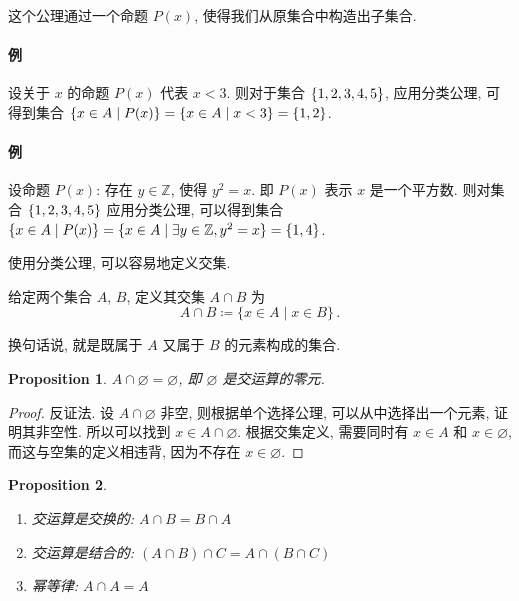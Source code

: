 \documentclass[UTF8]{ctexart}
\theoremstyle{mystyle}
\newtheorem{proposition}{Proposition}[section]
\theoremstyle{myremark}
\theoremstyle{plain}
\newcommand{\Z}{\mathbb Z}
\DeclarePairedDelimiter\set{\{}{\}}
\begin{document}
这个公理通过一个命题 $ P(x) $, 使得我们从原集合中构造出子集合. 

\paragraph{例} 设关于 $ x $ 的命题 $ P(x) $ 代表 $ x < 3 $. 则对于集合 $ \set{1, 2, 3, 4, 5} $, 应用分类公理, 可得到集合 $ \set{x \in A \mid P(x)} = \set{x \in A \mid x < 3} = \set{1, 2} $.

\paragraph{例} 设命题 $ P(x) $: 存在 $ y \in \Z $, 使得 $ y^2 = x $. 即 $ P(x) $ 表示 $ x $ 是一个平方数. 则对集合 $ \set{1, 2, 3, 4, 5} $ 应用分类公理, 可以得到集合 $ \set{x \in A \mid P(x)} = \set{x \in A \mid \exists y \in \Z, y^2 = x} = \set{1, 4} $.

使用分类公理, 可以容易地定义交集.

\begin{definition}[\text{交}]
    给定两个集合 $ A $, $ B $, 定义其交集 $ A \cap B $ 为
    \[ A \cap B \coloneqq \{x \in A \mid x \in B\} \,.\]

    换句话说, 就是既属于 $ A $ 又属于 $ B $ 的元素构成的集合.
\end{definition}

\begin{proposition}
    $ A \cap \varnothing = \varnothing $, 即 $ \varnothing $ 是交运算的零元.
\end{proposition}

\begin{proof}
    反证法. 设 $ A \cap \varnothing $ 非空, 则根据单个选择公理, 可以从中选择出一个元素, 证明其非空性. 所以可以找到 $ x \in A \cap \varnothing $. 根据交集定义, 需要同时有 $ x \in A $ 和 $ x \in \varnothing $, 而这与空集的定义相违背, 因为不存在 $ x \in \varnothing $.
\end{proof}

\begin{proposition} \ 
    \begin{enumerate}
        \item 交运算是交换的: $ A \cap B = B \cap A $
        \item 交运算是结合的: $ (A \cap B) \cap C = A \cap (B \cap C) $
        \item 幂等律: $ A \cap A = A $
    \end{enumerate}
\end{proposition}
\end{document}
